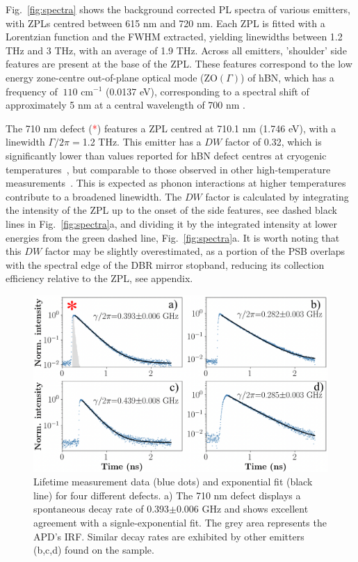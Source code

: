Fig.~\ref{fig:spectra} shows the background corrected PL spectra of various emitters, with ZPLs centred between 615 nm and 720 nm. Each ZPL is fitted with a Lorentzian function and the FWHM extracted, yielding linewidths between 1.2 THz and 3 THz, with an average of 1.9 THz. Across all emitters, 'shoulder' side features are present at the base of the ZPL. These features correspond to the low energy zone-centre out-of-plane optical mode (ZO$(\Gamma)$) of hBN, which has a frequency of $~110$ cm$^{-1}$ (0.0137 eV), corresponding to a spectral shift of approximately 5 nm at a central wavelength of 700 nm \cite{Cusco2016,Jin2017}. 

The 710 nm defect (\textcolor{red}{*}) features a ZPL centred at 710.1 nm (1.746 eV), with a linewidth $\Gamma/2\pi=$1.2 THz. This emitter has a $DW$ factor of 0.32, which is significantly lower than values reported for hBN defect centres at cryogenic temperatures~\cite{Tran2016}, but comparable to those observed in other high-temperature measurements~\cite{Ari2025}. This is expected as phonon interactions at higher temperatures contribute to a broadened linewidth. The $DW$ factor is calculated by integrating the intensity of the ZPL up to the onset of the side features, see dashed black lines in Fig.~\ref{fig:spectra}a, and dividing it by the integrated intensity at lower energies from the green dashed line, Fig.~\ref{fig:spectra}a. It is worth noting that this $DW$ factor may be slightly overestimated, as a portion of the PSB overlaps with the spectral edge of the DBR mirror stopband, reducing its collection efficiency relative to the ZPL, see appendix. 

\begin{figure}[h]
    \centering
    \includegraphics[width=0.9\linewidth]{Figures/Lifetimes.png}
    \caption{Lifetime measurement data (blue dots) and exponential fit (black line) for four different defects. a) The 710 nm defect displays a spontaneous decay rate of 0.393$\pm$0.006 GHz and shows excellent agreement with a signle-exponential fit. The grey area represents the APD's IRF. Similar decay rates are exhibited by other emitters (b,c,d) found on the sample.}
    \label{fig:lifetimes}
\end{figure}

